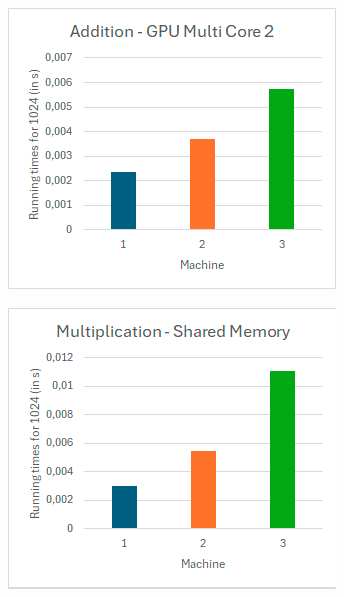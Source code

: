 \begin{figure}[ht]
     \centering
     \begin{subfigure}[b]{0.32\textwidth}
         \centering
         \includegraphics[width=\textwidth]{Documents/Report/Figures/Addition.png}
         \label{fig:addition diagram}
     \end{subfigure}
     \hfill
     \begin{subfigure}[b]{0.32\textwidth}
         \centering
         \includegraphics[width=\textwidth]{Documents/Report/Figures/Multiplication.png}

\end{subfigure}
\end{figure}
